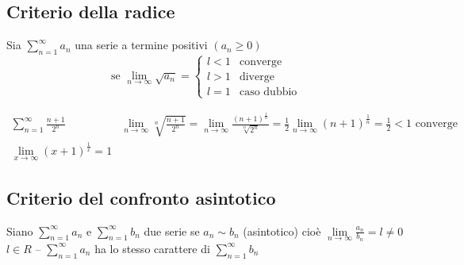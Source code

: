 \subsection{Criterio della radice}
Sia $\sum_{n=1}^\infty a_n$ una serie a termine positivi $(a_n\geq 0)$
\begin{equation*}
  \text{se }\lim_{n\to \infty} \sqrt{a_n}=\begin{cases}
                                            l<1 & \text{converge}\\
                                            l>1 & \text{diverge}\\
                                            l=1 & \text{caso dubbio}
                                          \end{cases}
\end{equation*}
\begin{esempio}
	\begin{eqnarray*}
		\displaystyle\sum_{n=1}^{\infty}\frac{n+1}{2^n} & \lim\limits_{n\to
		\infty}
		\sqrt[n]{\frac{n+1}{2^n}}=\lim\limits_{n\to\infty}
		\frac{(n+1)^{\frac{1}{n}}}{\sqrt[n]{2^n}}=\frac{1}{2}\lim_{n\to \infty}
		(n+1)^\frac{1}{n}=\frac{1}{2}<1 \text{ converge}\\
		\lim\limits_{x\to \infty} (x+1)^\frac{1}{x}=1
	\end{eqnarray*}
\end{esempio}
\subsection{Criterio del confronto asintotico}
Siano $\displaystyle\sum_{n=1}^\infty a_n$ e $\displaystyle\sum_{n=1}^\infty b_n$ due serie se $a_n\sim
b_n$ (asintotico) cioè $\lim\limits_{n\to \infty}\frac{a_n}{b_n}=l\neq 0$ $l\in
R$ -- $\displaystyle\sum_{n=1}^{\infty}a_n$ ha lo stesso carattere di $\displaystyle\sum_{n=1}^\infty b_n$
